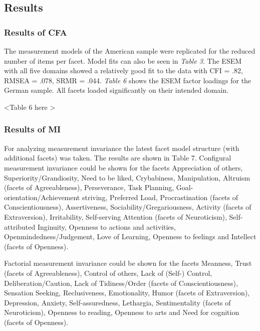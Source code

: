 \documentclass[,man]{apa6}
\theoremstyle{definition}
\theoremstyle{definition}
\theoremstyle{definition}
\theoremstyle{remark}
\begin{document}
\hypertarget{results-1}{%
\subsection{Results}\label{results-1}}

\hypertarget{results-of-cfa}{%
\subsubsection{Results of CFA}\label{results-of-cfa}}

The measurement models of the American sample were replicated for the
reduced number of items per facet. Model fits can also be seen in
\emph{Table 3}. The ESEM with all five domains showed a relatively good
fit to the data with CFI = .82, RMSEA = .078, SRMR = .044. \emph{Table
6} shows the ESEM factor loadings for the German sample. All facets
loaded significantly on their intended domain.

\vspace{5mm}

\textless{}Table 6 here \textgreater{}

\vspace{5mm}

\hypertarget{results-of-mi}{%
\subsubsection{Results of MI}\label{results-of-mi}}

For analyzing measurement invariance the latest facet model structure
(with additional facets) was taken. The results are shown in Table 7.
Configural measurement invariance could be shown for the facets
Appreciation of others, Superiority/Grandiosity, Need to be liked,
Crybabiness, Manipulation, Altruism (facets of Agreeableness),
Perseverance, Task Planning, Goal-orientation/Achievement striving,
Preferred Load, Procrastination (facets of Conscientiousness),
Assertiveness, Sociability/Gregariousness, Activity (facets of
Extraversion), Irritability, Self-serving Attention (facets of
Neuroticism), Self-attributed Inginuity, Openness to actions and
activities, Openmindedness/Judgement, Love of Learning, Openness to
feelings and Intellect (facets of Openness).

Factorial measurement invariance could be shown for the facets Meanness,
Trust (facets of Agreeableness), Control of others, Lack of (Self-)
Control, Deliberation/Caution, Lack of Tidiness/Order (facets of
Conscientiousness), Sensation Seeking, Reclusiveness, Emotionality,
Humor (facets of Extraversion), Depression, Anxiety, Self-assuredness,
Lethargia, Sentimentality (facets of Neuroticism), Openness to reading,
Openness to arts and Need for cognition (facets of Openness).
\end{document}
